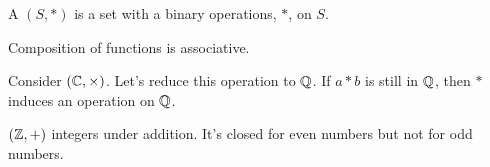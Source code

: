 \documentclass[class=article,crop=false]{standalone}
\begin{document}
\begin{defn}
	A  $(S,*)$ is a set with a binary operations, $*$, on  $S$.
\end{defn}

\begin{thm}
Composition of functions is associative.
\end{thm}

Consider $(\mathbb{C},\times)$. Let's reduce this operation to $\mathbb{Q}$.
If $a*b$ is still in $\mathbb{Q}$, then $*$ induces an operation on  $\mathbb{Q}$.

\begin{eg}[]
	$(\mathbb{Z},+)$ integers under addition. It's closed for even numbers but not for odd numbers.
\end{eg}
\end{document}
